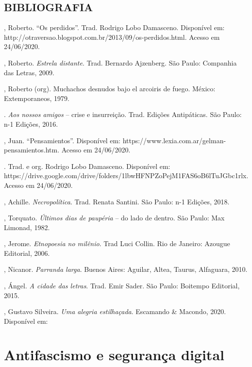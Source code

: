 \section{BIBLIOGRAFIA}

\begin{Parskip}
, Roberto. ``Os perdidos''. Trad. Rodrigo Lobo Damasceno. Disponível
em: http://otraversao.blogspot.com.br/2013/09/os-perdidos.html. Acesso
em 24/06/2020.

, Roberto. \emph{Estrela distante}. Trad. Bernardo Ajzenberg. São
Paulo: Companhia das Letras, 2009.

, Roberto (org). Muchachos desnudos bajo el arcoiris de fuego.
México: Extemporaneos, 1979.

. \emph{Aos nossos amigos} -- crise e insurreição. Trad.
Edições Antipáticas. São Paulo: n-1 Edições, 2016.

, Juan. ``Pensamientos''. Disponível em:
https://www.lexia.com.ar/gelman-pensamientos.htm. Acesso em 24/06/2020.

. Trad. e org. Rodrigo Lobo Damasceno. Disponível em:
https://drive.google.com/drive/folders/1lbwHFNPZoPejM1FAS6oB6lTuJGbc1rlx.
Acesso em 24/06/2020.

, Achille. \emph{Necropolítica}. Trad. Renata Santini. São Paulo:
n-1 Edições, 2018.

, Torquato. \emph{Últimos dias de paupéria} -- do lado de dentro. São
Paulo: Max Limonad, 1982.

, Jerome. \emph{Etnopoesia no milênio}. Trad Luci Collin. Rio
de Janeiro: Azougue Editorial, 2006.

, Nicanor. \emph{Parranda larga}. Buenos Aires: Aguilar, Altea,
Taurus, Alfaguara, 2010.

, Ángel. \emph{A cidade das letras}. Trad. Emir Sader. São Paulo:
Boitempo Editorial, 2015.

, Gustavo Silveira. \emph{Uma alegria estilhaçada}. Escamando \&
Macondo, 2020. Disponível em:
\end{Parskip}

\chapter[Antifascismo e segurança digital]{Antifascismo e segurança digital}

